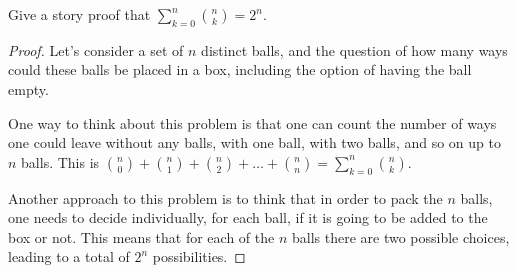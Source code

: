 \begin{exercise}{15}
    Give a story proof that $\sum_{k=0}^n {n \choose k} = 2^n$.
\end{exercise}

\begin{proof}
    Let's consider a set of $n$ distinct balls, and the question of how many ways could these balls be placed in a box, including the option of having the ball empty.

    One way to think about this problem is that one can count the number of ways one could leave without any balls, with one ball, with two balls, and so on up to $n$ balls. This is ${n \choose 0} + {n \choose 1} + {n \choose 2} + \dots + {n \choose n} = \sum_{k=0}^n {n \choose k}$.

    Another approach to this problem is to think that in order to pack the $n$ balls, one needs to decide individually, for each ball, if it is going to be added to the box or not. This means that for each of the $n$ balls there are two possible choices, leading to a total of $2^n$ possibilities.
\end{proof}


